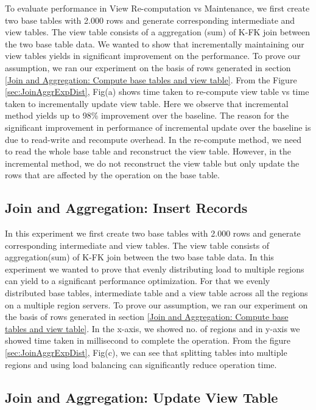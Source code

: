 \documentclass[11pt,a4paper,bibtotoc,idxtotoc,headsepline,footsepline,footexclude,BCOR12mm,DIV13]{scrbook}
\begin{document}
To evaluate performance in View Re-computation vs Maintenance, we first create two base tables with 2.000 rows and generate corresponding intermediate and view tables. The view table consists of a aggregation (sum) of K-FK join between the two base table data. We wanted to show that incrementally maintaining our view tables yields in significant improvement on the performance. To prove our assumption, we ran our experiment on the basis of rows generated in section \ref{Join and Aggregation: Compute base tables and view table}. From the Figure \ref{sec:JoinAggrExpDist}, Fig(a) shows time taken to re-compute view table vs time taken to incrementally update view table. Here we observe that incremental method yields up to 98\% improvement over the baseline. The reason for the significant improvement in performance of incremental update over the baseline is due to read-write and recompute overhead. In the re-compute method, we need to read the whole base table and
reconstruct the view table. However, in the incremental method, we do not reconstruct the view table but only update the rows that are affected by the operation on the base table. 


\subsection{Join and Aggregation: Insert Records}
\label{Join and Aggregation: Insert Records Distributed}
In this experiment we first create two base tables with 2.000 rows and generate corresponding intermediate and view tables. The view table consists of aggregation(sum) of K-FK join between the two base table data. In this experiment we wanted to prove that evenly distributing load to multiple regions can yield to a significant performance optimization. For that we evenly distributed base tables, intermediate table and a view table across all the regions on a multiple region servers.  
To prove our assumption, we ran our experiment on the basis of rows generated in section \ref{Join and Aggregation: Compute base tables and view table}. In the x-axis, we showed no. of regions and in y-axis we showed time taken in millisecond to complete the operation. From the figure \ref{sec:JoinAggrExpDist}, Fig(c), we can see that splitting tables into multiple regions and using load balancing can significantly reduce operation time.

\subsection{Join and Aggregation: Update View Table} 
\label{Join and Aggr: Update View Table Distributed}
\end{document}
